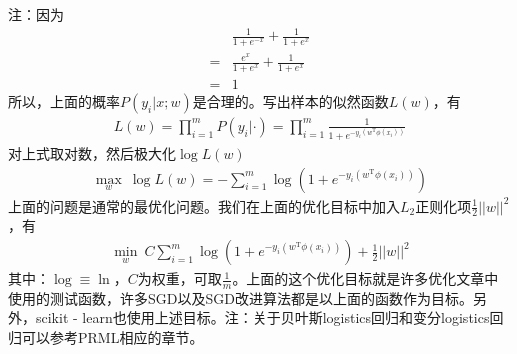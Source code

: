         注：因为
        \begin{align*}
        &\frac{1}{1+e^{-x}}+\frac{1}{1+e^x} \\
        ={}&\frac{e^x}{1+e^x}+\frac{1}{1+e^x} \\
        ={}&1
        \end{align*}
        所以，上面的概率$P(y_i|x;w)$是合理的。写出样本的似然函数$L(w)$，有
        \begin{align*}
        L(w) = \prod_{i=1}^mP(y_i|\cdot) = \prod_{i=1}^m\frac{1}{1+e^{-y_i(w^\mathrm{T}\phi(x_i))}}
        \end{align*}
        对上式取对数，然后极大化$\log L(w)$
        \begin{align*}
        \max_w \ \log L(w) = -\sum_{i=1}^m\log\left(1+e^{-y_i(w^\mathrm{T}\phi(x_i))}\right)
        \end{align*}
        上面的问题是通常的最优化问题。我们在上面的优化目标中加入$L_2$正则化项$\frac{1}{2}||w||^2$，有
        \begin{align*}
        \min_w\ C\sum_{i=1}^m\log \left( 1+e^{-y_i(w^\mathrm{T}\phi(x_i))} \right) +\frac{1}{2}||w||^2
        \end{align*}
        其中：$\log \equiv \ln$，$C$为权重，可取$\frac{1}{m}$。上面的这个优化目标就是许多优化文章中使用的测试函数，许多SGD以及SGD改进算法都是以上面的函数作为目标。另外，scikit - learn也使用上述目标。注：关于贝叶斯logistics回归和变分logistics回归可以参考PRML相应的章节。

